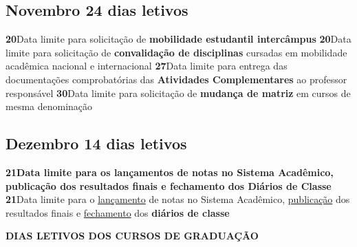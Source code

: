 \documentclass[thesis]{hmcposter}
\begin{document}
\begin{poster}
\subsection{Novembro \hfill 24 dias letivos}\textbf{20}\qquad Data limite para solicitação de \textbf{mobilidade estudantil intercâmpus} \newline \null\textbf{20}\qquad Data limite para solicitação de \textbf{convalidação de disciplinas} cursadas em mobilidade acadêmica nacional e internacional \newline \null\textbf{27}\qquad Data limite para entrega das documentações comprobatórias das \textbf{Atividades Complementares} ao professor responsável \newline \null\textbf{30}\qquad Data limite para solicitação de \textbf{mudança de matriz} em cursos de mesma denominação \newline \null\subsection{Dezembro \hfill 14 dias letivos}\textbf{21}\qquad \textbf{Data limite para os lançamentos de notas no Sistema Acadêmico, publicação dos resultados finais e fechamento dos Diários de Classe} \newline \null\textbf{21}\qquad Data limite para o \underline{lançamento} de notas no Sistema Acadêmico, \underline{publicação} dos resultados finais e \underline{fechamento} dos \textbf{diários de classe} \newline \null\newpage
~
\vfill
\begin{center}
\large \textbf{DIAS LETIVOS DOS CURSOS DE GRADUAÇÃO}
\newline
\null
\newline
\begin{table}
\centering
{}
\end{table}
\null
\end{center}

\end{poster}
\end{document}
